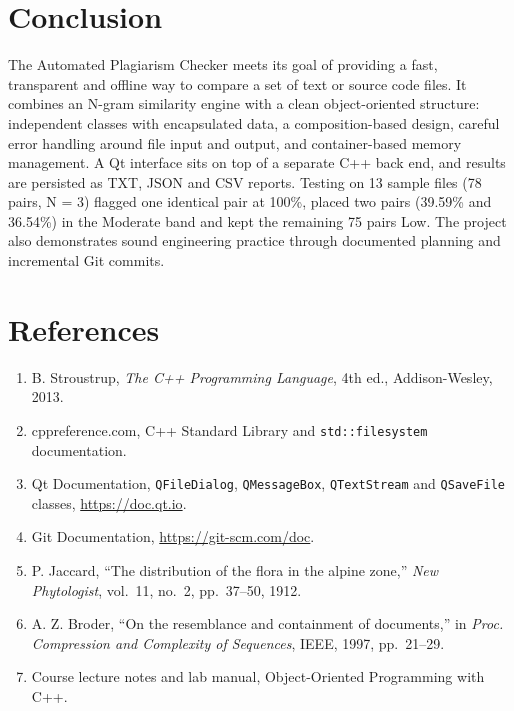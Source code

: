 \documentclass[12pt,a4paper,oneside]{book}
\begin{document}
\section{Conclusion}
The Automated Plagiarism Checker meets its goal of providing a fast, transparent and offline way to compare a set of text or source code files. It combines an N-gram similarity engine with a clean object-oriented structure: independent classes with encapsulated data, a composition-based design, careful error handling around file input and output, and container-based memory management. A Qt interface sits on top of a separate C++ back end, and results are persisted as TXT, JSON and CSV reports. Testing on 13 sample files (78 pairs, N = 3) flagged one identical pair at 100\%, placed two pairs (39.59\% and 36.54\%) in the Moderate band and kept the remaining 75 pairs Low. The project also demonstrates sound engineering practice through documented planning and incremental Git commits.

\section{References}
\begin{enumerate}
  \item B. Stroustrup, \emph{The C++ Programming Language}, 4th ed., Addison-Wesley, 2013.
  \item cppreference.com, C++ Standard Library and \texttt{std::filesystem} documentation.
  \item Qt Documentation, \texttt{QFileDialog}, \texttt{QMessageBox}, \texttt{QTextStream} and \texttt{QSaveFile} classes, \url{https://doc.qt.io}.
  \item Git Documentation, \url{https://git-scm.com/doc}.
  \item P. Jaccard, ``The distribution of the flora in the alpine zone,'' \emph{New Phytologist}, vol.~11, no.~2, pp.~37--50, 1912.
  \item A. Z. Broder, ``On the resemblance and containment of documents,'' in \emph{Proc. Compression and Complexity of Sequences}, IEEE, 1997, pp.~21--29.
  \item Course lecture notes and lab manual, Object-Oriented Programming with C++.
\end{enumerate}

\end{document}
